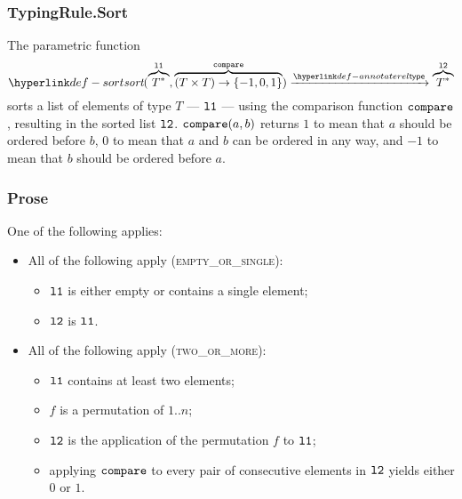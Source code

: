 \begin{mathpar}
\end{mathpar}

\subsubsection{TypingRule.Sort\label{sec:sortinglists}}
\hypertarget{def-sort}{}
The parametric function
\[
\sort(\overname{T^*}{\vlone}, \overname{(T\times T)\rightarrow \{-1,0,1\}}{\compare}) \typearrow \overname{T^*}{\vltwo}
\]
sorts a list of elements of type $T$ --- $\vlone$ --- using the comparison function $\compare$,
resulting in the sorted list $\vltwo$.
$\compare(a, b)$ returns $1$ to mean that $a$ should be ordered before $b$,
$0$ to mean that $a$ and $b$ can be ordered in any way,
and $-1$ to mean that $b$ should be ordered before $a$.

\subsubsection{Prose}
One of the following applies:
\begin{itemize}
  \item All of the following apply (\textsc{empty\_or\_single}):
  \begin{itemize}
    \item $\vlone$ is either empty or contains a single element;
    \item $\vltwo$ is $\vlone$.
  \end{itemize}

  \item All of the following apply (\textsc{two\_or\_more}):
  \begin{itemize}
    \item $\vlone$ contains at least two elements;
    \item $f$ is a permutation of $1..n$;
    \item $\vltwo$ is the application of the permutation $f$ to $\vlone$;
    \item applying $\compare$ to every pair of consecutive elements in $\vltwo$ yields either $0$ or $1$.
  \end{itemize}
\end{itemize}

